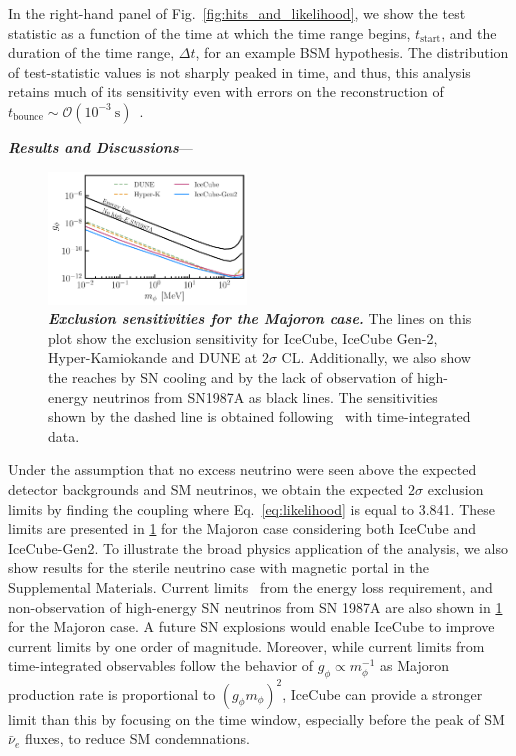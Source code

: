 \documentclass[aps,twocolumn,prl,showpacs,showkeys,preprintnumbers,superscriptaddress,nobibnotes,floatfix,longbibliography,notitlepage,nofootinbib]{revtex4-2}
\begin{document}
In the right-hand panel of Fig.~\ref{fig:hits_and_likelihood}, we show the test statistic as a function of the time at which the time range begins, $t_{\mathrm{start}}$, and the duration of the time range, $\Delta t$, for an example BSM hypothesis. The distribution of test-statistic values is not sharply peaked in time, and thus, this analysis retains much of its sensitivity even with errors on the reconstruction of $t_{\mathrm{bounce}}\sim\mathcal{O}\left(10^{-3}~\mathrm{s}\right)$~\cite{Halzen_2009}.




\textbf{\textit{Results and Discussions}}---
\begin{figure}[t!]
    \centering
    \includegraphics[width=0.47\textwidth]{figures/majoran_sensitivity}
    \caption{\textbf{\textit{Exclusion sensitivities for the Majoron case.}}
    The lines on this plot show the exclusion sensitivity for IceCube, IceCube Gen-2, Hyper-Kamiokande and DUNE at $2\sigma$ CL.
    Additionally, we also show the reaches by SN cooling and by the lack of observation of high-energy neutrinos from SN1987A as black lines. 
    The sensitivities shown by the dashed line is obtained following~\cite{Brdar:2023tmi} with time-integrated data.
    }
    \label{fig:sensitivity}
\end{figure} 
Under the assumption that no excess neutrino were seen above the expected detector backgrounds and SM neutrinos, we obtain the expected $2\sigma$ exclusion limits by finding the coupling where Eq.~\ref{eq:likelihood} is equal to 3.841.
These limits are presented in \cref{fig:sensitivity} for the Majoron case considering both IceCube and IceCube-Gen2.
To illustrate the broad physics application of the analysis, we also show results for the sterile neutrino case with magnetic portal in the Supplemental Materials.
Current limits~\cite{Fiorillo:2022cdq} from the energy loss requirement, and non-observation of high-energy SN neutrinos from SN 1987A are also shown in \cref{fig:sensitivity} for the Majoron case.
A future SN explosions would enable IceCube to improve current limits by one order of magnitude. 
Moreover, while current limits from time-integrated observables follow the behavior of $g_\phi\propto m^{-1}_\phi$ as Majoron production rate is proportional to $(g_\phi m_\phi)^2$, IceCube can provide a stronger limit than this by focusing on the time window, especially before the peak of SM $\bar{\nu}_e$ fluxes, to reduce SM condemnations.
\end{document}
